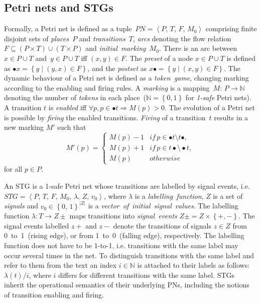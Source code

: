 \documentclass[british,compsoc]{IEEEtran}
\begin{document}

\subsection{Petri nets and STGs}



Formally, a Petri net is defined as a tuple~$PN=\left\langle P,\, T,\, F,\, M_{0}\right\rangle $
comprising finite disjoint sets of \emph{places~}$P$ and \emph{transitions~}$T$,
\emph{arcs} denoting the flow relation~$F\subseteq\left(P\times T\right)\cup\left(T\times P\right)$
and \emph{initial~marking~}$M_{0}$. There is an arc between~$x\in P\cup T$
and~$y\in P\cup T$ iff $\left(x,y\right)\in F$. The \emph{preset}
of a node $x\in P\cup T$ is defined as $\bullet x=\left\{ y\mid\left(y,x\right)\in F\right\} $,
and the \emph{postset} as $x\bullet=\left\{ y\mid\left(x,y\right)\in F\right\} $.
The dynamic behaviour of a Petri net is defined as a \emph{token~game},
changing marking according to the enabling and firing rules. A \emph{marking}
is a mapping~$M:\, P\rightarrow\mathbb{N}$ denoting the number of
\emph{tokens} in each place~($\mathbb{N}=\left\{ 0,1\right\} $ for
\emph{1-safe} Petri nets). A transition $t$ is \emph{enabled} iff
$\forall p,p\in\bullet t\Rightarrow M(p)>0$. The evolution of a Petri
net is possible by \emph{firing} the enabled transitions. \emph{Firing}
of a transition~$t$ results in a new marking $M'$ such that
\[
M'\left(p\right)=\left\{ \begin{array}{cc}
M(p)-1 & if\, p\in\bullet t\setminus t\bullet,\\
M(p)+1 & if\, p\in t\bullet\setminus\bullet t,\\
M(p)\,\,\,\,\, & otherwise
\end{array}\right.
\]
 for all $p\in P$.

An STG is a 1-safe Petri net whose transitions are labelled by signal
events, i.e. $STG=\left\langle P,\, T,\, F,\, M_{0},\,\lambda,\, Z,\, v_{0}\right\rangle $,
where $\lambda$ is a \emph{labelling~function}, $Z$ is a set of
\emph{signals} and $v_{0}\in\left\{ 0,\,1\right\} ^{\left|Z\right|}$
is a \emph{vector~of}~\emph{initial~signal~values}. The labelling
function $\lambda:T\rightarrow Z\pm$ maps transitions into \emph{signal~events}
$Z\pm=Z\times\left\{ +,-\right\} $. The signal events labelled $z+$
and $z-$ denote the transitions of signals $z\in Z$ from 0~to~1~(rising
edge), or from 1~to~0~(falling edge), respectively. The labelling
function does not have to be 1-to-1, i.e. transitions with the same
label may occur several times in the net. To distinguish transitions
with the same label and refer to them from the text an index $i\in\mathbb{N}$
is attached to their labels as follows: $\lambda\left(t\right)/i$,
where $i$ differs for different transitions with the same label.
STGs inherit the operational semantics of their underlying PNs, including
the notions of transition enabling and firing.
\end{document}
